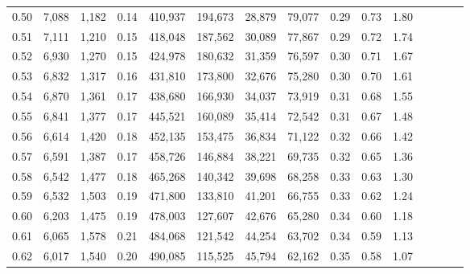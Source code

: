 \begin{tabular}{rrrcrrrrrrrrrrr}
0.50 &  7,088 &  1,182 &                                       0.14 &  410,937 &  194,673 &   28,879 &   79,077 &  0.29 &  0.73 &                         1.80 \\
0.51 &  7,111 &  1,210 &                                       0.15 &  418,048 &  187,562 &   30,089 &   77,867 &  0.29 &  0.72 &                         1.74 \\
0.52 &  6,930 &  1,270 &                                       0.15 &  424,978 &  180,632 &   31,359 &   76,597 &  0.30 &  0.71 &                         1.67 \\
0.53 &  6,832 &  1,317 &                                       0.16 &  431,810 &  173,800 &   32,676 &   75,280 &  0.30 &  0.70 &                         1.61 \\
0.54 &  6,870 &  1,361 &                                       0.17 &  438,680 &  166,930 &   34,037 &   73,919 &  0.31 &  0.68 &                         1.55 \\
0.55 &  6,841 &  1,377 &                                       0.17 &  445,521 &  160,089 &   35,414 &   72,542 &  0.31 &  0.67 &                         1.48 \\
0.56 &  6,614 &  1,420 &                                       0.18 &  452,135 &  153,475 &   36,834 &   71,122 &  0.32 &  0.66 &                         1.42 \\
0.57 &  6,591 &  1,387 &                                       0.17 &  458,726 &  146,884 &   38,221 &   69,735 &  0.32 &  0.65 &                         1.36 \\
0.58 &  6,542 &  1,477 &                                       0.18 &  465,268 &  140,342 &   39,698 &   68,258 &  0.33 &  0.63 &                         1.30 \\
0.59 &  6,532 &  1,503 &                                       0.19 &  471,800 &  133,810 &   41,201 &   66,755 &  0.33 &  0.62 &                         1.24 \\
0.60 &  6,203 &  1,475 &                                       0.19 &  478,003 &  127,607 &   42,676 &   65,280 &  0.34 &  0.60 &                         1.18 \\
0.61 &  6,065 &  1,578 &                                       0.21 &  484,068 &  121,542 &   44,254 &   63,702 &  0.34 &  0.59 &                         1.13 \\
0.62 &  6,017 &  1,540 &                                       0.20 &  490,085 &  115,525 &   45,794 &   62,162 &  0.35 &  0.58 &                         1.07 \\

\end{tabular}
